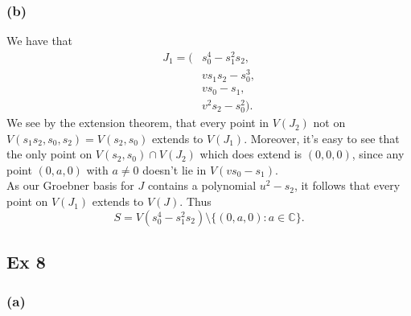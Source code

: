 \documentclass{article}
\theoremstyle{definition}
\newcommand{\C}{\mathbb{C}}
\begin{document}
\subsubsection*{(b)}

We have that
\begin{align*}
	J_1 = \Big(&s_{0}^{4}-s_{1}^{2}s_{2}, \\
			   &vs_{1}s_{2}-s_{0}^{3}, \\
			   &vs_{0}-s_{1}, \\
			   &v^{2}s_{2}-s_{0}^{2} \Big).
\end{align*}
We see by the extension theorem, that every point in $V(J_2)$ not on $V(s_1s_2,
s_0, s_2) = V(s_2, s_0)$ extends to $V(J_1)$. Moreover, it's easy to see that
the only point on $V(s_2, s_0) \cap V(J_2)$ which does extend is $(0, 0, 0)$,
since any point $(0, a, 0)$ with $a \not = 0$ doesn't lie in $V(vs_0 - s_1)$. \\

As our Groebner basis for $J$ contains a polynomial $u^{2} - s_2$, it follows
that every point on $V(J_1)$ extends to $V(J)$. Thus
\[
	S 
	= 
	V(s_0^{4} - s_1^{2}s_2) \setminus \{(0, a, 0) : a \in \C\}.
\]


\subsection*{Ex 8}
\subsubsection*{(a)}
\end{document}
